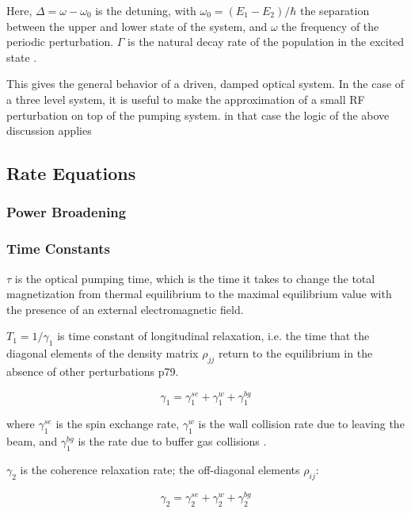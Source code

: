 Here, $\Delta = \omega - \omega_0$ is the detuning, with $\omega_0 =
(E_1 - E_2)/\hbar$ the separation between the upper and lower state of
the system, and $\omega$ the frequency of the periodic
perturbation. $\Gamma$ is the natural decay rate of the population in
the excited state \cite{budker}.

This gives the general behavior of a driven, damped optical system. In
the case of a three level system, it is useful to make the
approximation of a small RF perturbation on top of the pumping
system. in that case the logic of the above discussion applies


\subsection{Rate Equations}\label{rateequations}

\subsubsection{Power Broadening}

\subsubsection{Time Constants}

$\tau$ is the optical pumping time, which is the time it takes to
change the total magnetization from thermal equilibrium to the maximal
equilibrium value with the presence of an external electromagnetic
field.

$T_1 = 1/\gamma_1$ is time constant of longitudinal relaxation,
i.e. the time that the diagonal elements of the density matrix
$\rho_{jj}$ return to the equilibrium in the absence of other
perturbations \cite{vanier} p79.

\begin{equation}
\gamma_1 = \gamma_1^{se} + \gamma_1^{w} + \gamma_1^{bg} 
\label{eqn:gamma1}
\end{equation}

where $\gamma_1^{se}$ is the spin exchange rate, $\gamma_1^{w}$ is the
wall collision rate due to leaving the beam, and $\gamma_1^{bg}$ is
the rate due to buffer gas collisions \cite{vanier}.

$\gamma_2$ is the coherence relaxation rate; the off-diagonal elements
$\rho_{ij}$:

\begin{equation}\gamma_2 = \gamma_2^{se} + \gamma_2^{w} + \gamma_2^{bg}
\label{eqn:gamma2}
\end{equation} 


